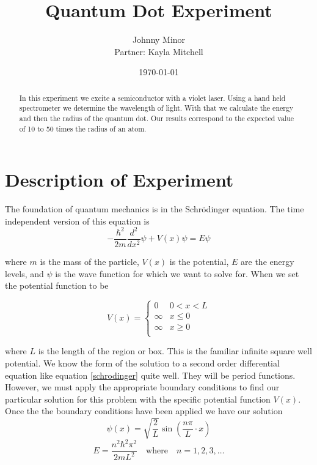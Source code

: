 \documentclass[12pt letterpaper]{article}
\title{Quantum Dot Experiment}
\author{Johnny Minor \\ Partner: Kayla Mitchell}
\date{\today}
\begin{document}
\maketitle

\begin{abstract}
In this experiment we excite a semiconductor with a violet laser. Using a hand held spectrometer we determine the wavelength of light. With that we calculate the energy and then the radius of the quantum dot. Our results correspond to the expected value of 10 to 50 times the radius of an atom. 

\end{abstract}

\newpage

\section*{Description of Experiment}

The foundation of quantum mechanics is in the Schr\"{o}dinger equation. The time independent version of this equation is 
\begin{equation}
\label{schrodinger}
-\frac{\hbar^2}{2m}\frac{d^2}{dx^2} \psi + V(x) \psi = E \psi
\end{equation}

where $m$ is the mass of the particle, $V(x)$ is the potential, $E$ are the energy levels, and $\psi$ is the wave function for which we want to solve for. When we set the potential function to be 

$$
V(x) = 
\begin{cases} 
      0 & 0 < x < L  \\
      \infty & x \leq 0 \\
      \infty & x \geq 0 \\
   \end{cases}
$$

where $L$ is the length of the region or box. This is the familiar infinite square well potential. We know the form of the solution to a second order differential equation like equation \ref{schrodinger} quite well. They will be period functions. However, we must apply the appropriate boundary conditions to find our particular solution for this problem with the specific potential function $V(x)$. Once the the boundary conditions have been applied we have our solution 
$$ 
\psi(x) = \sqrt{\frac{2}{L}} \sin(\frac{n \pi}{L} \cdot x)
$$
$$ 
E = \frac{n^2 \hbar^2 \pi^2 }{2mL^2} \quad \mathrm{where} \quad n = 1, 2, 3, \dots
$$
\end{document}
